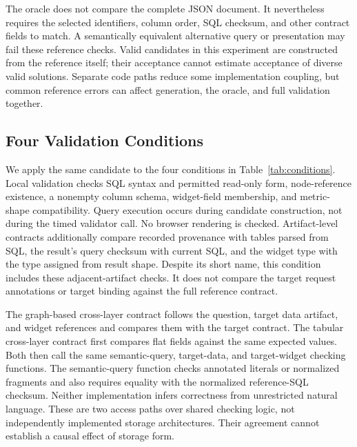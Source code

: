 \documentclass[manuscript,review,anonymous]{acmart}
\newcommand{\condition}[1]{\textsf{#1}}
\begin{document}
The oracle does not compare the complete JSON document. It nevertheless requires the selected identifiers, column order, SQL checksum, and other contract fields to match. A semantically equivalent alternative query or presentation may fail these reference checks. Valid candidates in this experiment are constructed from the reference itself; their acceptance cannot estimate acceptance of diverse valid solutions. Separate code paths reduce some implementation coupling, but common reference errors can affect generation, the oracle, and full validation together.

\subsection{Four Validation Conditions}

We apply the same candidate to the four conditions in Table~\ref{tab:conditions}. \condition{Local validation} checks SQL syntax and permitted read-only form, node-reference existence, a nonempty column schema, widget-field membership, and metric-shape compatibility. Query execution occurs during candidate construction, not during the timed validator call. No browser rendering is checked. \condition{Artifact-level contracts} additionally compare recorded provenance with tables parsed from SQL, the result's query checksum with current SQL, and the widget type with the type assigned from result shape. Despite its short name, this condition includes these adjacent-artifact checks. It does not compare the target request annotations or target binding against the full reference contract.

The \condition{graph-based cross-layer contract} follows the question, target data artifact, and widget references and compares them with the target contract. The \condition{tabular cross-layer contract} first compares flat fields against the same expected values. Both then call the same semantic-query, target-data, and target-widget checking functions. The semantic-query function checks annotated literals or normalized fragments and also requires equality with the normalized reference-SQL checksum. Neither implementation infers correctness from unrestricted natural language. These are two access paths over shared checking logic, not independently implemented storage architectures. Their agreement cannot establish a causal effect of storage form.
\end{document}
